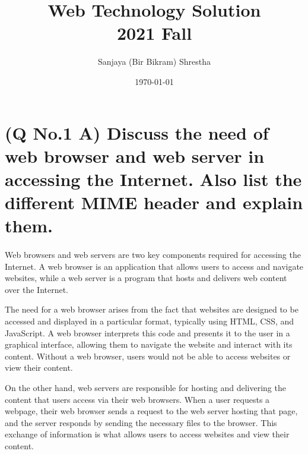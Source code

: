 \documentclass[11pt]{article}
\title{ Web Technology Solution\\2021 Fall}
\author{ Sanjaya (Bir Bikram) Shrestha }
\date{\today}
\begin{document}
\maketitle	
\pagestyle{fancy}

\tableofcontents
\pagebreak



\section{(Q No.1 A) Discuss the need of web browser and web server in accessing the Internet. Also list the different MIME header and explain them.}

\paragraph{}
Web browsers and web servers are two key components required for accessing the Internet. A web browser is an application that allows users to access and navigate websites, while a web server is a program that hosts and delivers web content over the Internet.

The need for a web browser arises from the fact that websites are designed to be accessed and displayed in a particular format, typically using HTML, CSS, and JavaScript. A web browser interprets this code and presents it to the user in a graphical interface, allowing them to navigate the website and interact with its content. Without a web browser, users would not be able to access websites or view their content.

On the other hand, web servers are responsible for hosting and delivering the content that users access via their web browsers. When a user requests a webpage, their web browser sends a request to the web server hosting that page, and the server responds by sending the necessary files to the browser. This exchange of information is what allows users to access websites and view their content.
\end{document}
